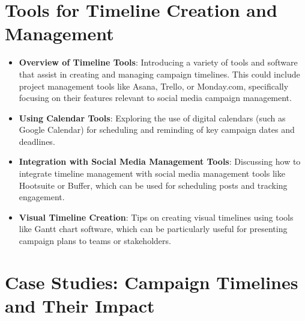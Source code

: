 \documentclass[
]{book}
\providecommand{\tightlist}{%
  \setlength{\itemsep}{0pt}\setlength{\parskip}{0pt}}
\begin{document}
\hypertarget{tools-for-timeline-creation-and-management}{%
\section*{Tools for Timeline Creation and Management}\label{tools-for-timeline-creation-and-management}}

\begin{itemize}
\tightlist
\item
  \textbf{Overview of Timeline Tools}: Introducing a variety of tools and software that assist in creating and managing campaign timelines. This could include project management tools like Asana, Trello, or Monday.com, specifically focusing on their features relevant to social media campaign management.
\item
  \textbf{Using Calendar Tools}: Exploring the use of digital calendars (such as Google Calendar) for scheduling and reminding of key campaign dates and deadlines.
\item
  \textbf{Integration with Social Media Management Tools}: Discussing how to integrate timeline management with social media management tools like Hootsuite or Buffer, which can be used for scheduling posts and tracking engagement.
\item
  \textbf{Visual Timeline Creation}: Tips on creating visual timelines using tools like Gantt chart software, which can be particularly useful for presenting campaign plans to teams or stakeholders.
\end{itemize}

\hypertarget{case-studies-campaign-timelines-and-their-impact}{%
\section*{Case Studies: Campaign Timelines and Their Impact}\label{case-studies-campaign-timelines-and-their-impact}}
\end{document}
